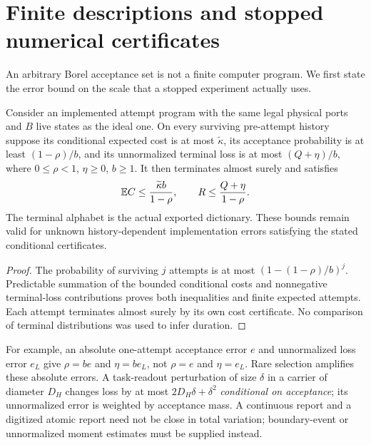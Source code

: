 \section{Finite descriptions and stopped numerical certificates}
\label{sec:numerics}
An arbitrary Borel acceptance set is not a finite computer program. We first state the error bound on the scale that a stopped experiment actually uses.

\begin{proposition}\label{prop:relative}
Consider an implemented attempt program with the same legal physical ports and $B$ live states as the ideal one. On every surviving pre-attempt history suppose its conditional expected cost is at most $\widetilde\kappa$, its acceptance probability is at least $(1-\rho)/b$, and its unnormalized terminal loss is at most $(Q+\eta)/b$, where $0\le\rho<1$, $\eta\ge0$, $b\ge1$. It then terminates almost surely and satisfies
\begin{equation}\label{eq:relative}
 \mathbb E C\le\frac{\widetilde\kappa b}{1-\rho},\qquad
 R\le\frac{Q+\eta}{1-\rho}.
\end{equation}
The terminal alphabet is the actual exported dictionary. These bounds remain valid for unknown history-dependent implementation errors satisfying the stated conditional certificates.
\end{proposition}
\begin{proof}
The probability of surviving $j$ attempts is at most $(1-(1-\rho)/b)^j$. Predictable summation of the bounded conditional costs and nonnegative terminal-loss contributions proves both inequalities and finite expected attempts. Each attempt terminates almost surely by its own cost certificate. No comparison of terminal distributions was used to infer duration.
\end{proof}

For example, an absolute one-attempt acceptance error $e$ and unnormalized loss error $e_L$ give $\rho=be$ and $\eta=be_L$, not $\rho=e$ and $\eta=e_L$. Rare selection amplifies these absolute errors. A task-readout perturbation of size $\delta$ in a carrier of diameter $D_H$ changes loss by at most $2D_H\delta+\delta^2$ \emph{conditional on acceptance}; its unnormalized error is weighted by acceptance mass. A continuous report and a digitized atomic report need not be close in total variation; boundary-event or unnormalized moment estimates must be supplied instead.

